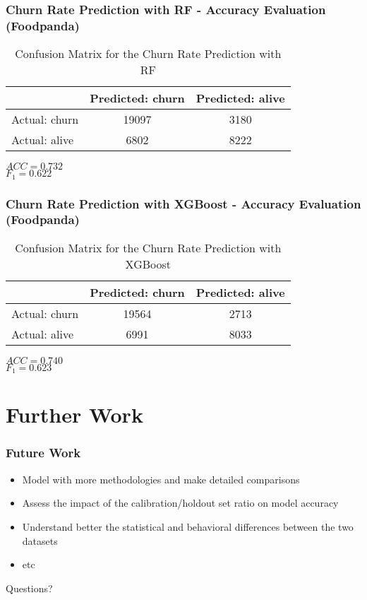 \documentclass{beamer} %
\theoremstyle{definition} %
\begin{document}
\begin{frame}
\frametitle{Churn Rate Prediction with RF - Accuracy Evaluation (Foodpanda)}
\begin{center}
            \begin{table}
\begin{tabular}{l | c | c }
 & Predicted: churn & Predicted: alive\\
\hline \hline
Actual: churn & 19097 & 3180\\ 
Actual: alive & 6802 & 8222
\end{tabular}
\caption{Confusion Matrix for the Churn Rate Prediction with RF}
\end{table}
        \end{center}      
       
\begin{rmk}
	$ACC=0.732$ \\    
    $F_1=0.622$
\end{rmk}
\end{frame}

\begin{frame}
\frametitle{Churn Rate Prediction with XGBoost - Accuracy Evaluation (Foodpanda)}
\begin{center}
            \begin{table}
\begin{tabular}{l | c | c }
 & Predicted: churn & Predicted: alive\\
\hline \hline
Actual: churn & 19564 & 2713\\ 
Actual: alive & 6991 & 8033
\end{tabular}
\caption{Confusion Matrix for the Churn Rate Prediction with XGBoost}
\end{table}
        \end{center}      
       
\begin{rmk}
	$ACC=0.740$ \\    
    $F_1=0.623$
\end{rmk}
\end{frame}

\section{Further Work} %
\begin{frame}
\frametitle{Future Work}
\begin{itemize}
\item Model with more methodologies and make detailed comparisons
\item Assess the impact of the calibration/holdout set ratio on model accuracy
\item Understand better the statistical and behavioral differences between the two datasets
\item etc
\end{itemize}
\end{frame}

\begin{frame}
Questions?
\end{frame}

\end{document}
